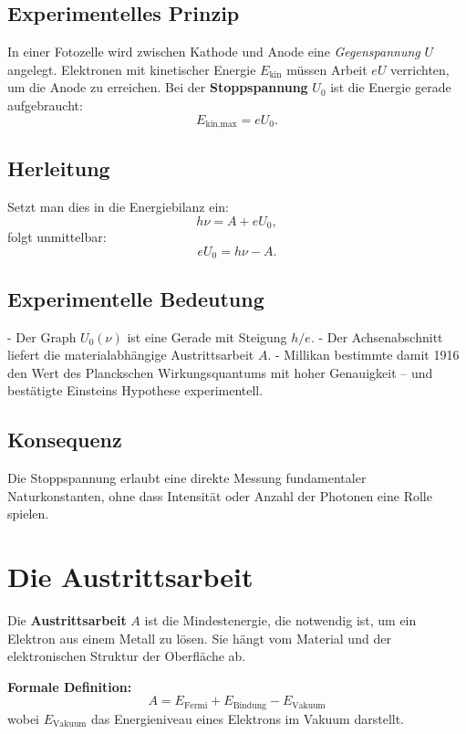 \subsection*{Experimentelles Prinzip}
In einer Fotozelle wird zwischen Kathode und Anode eine \emph{Gegenspannung} \(U\) angelegt.  
Elektronen mit kinetischer Energie \(E_{\text{kin}}\) müssen Arbeit \(eU\) verrichten, um die Anode zu erreichen.  
Bei der \textbf{Stoppspannung} \(U_0\) ist die Energie gerade aufgebraucht:
\[
E_{\text{kin,max}} = eU_0.
\]

\subsection*{Herleitung}
Setzt man dies in die Energiebilanz ein:
\[
h\nu = A + eU_0,
\]
folgt unmittelbar:
\[
eU_0 = h\nu - A.
\]

\subsection*{Experimentelle Bedeutung}
- Der Graph \(U_0(\nu)\) ist eine Gerade mit Steigung \(h/e\).  
- Der Achsenabschnitt liefert die materialabhängige Austrittsarbeit \(A\).  
- Millikan bestimmte damit 1916 den Wert des Planckschen Wirkungsquantums mit hoher Genauigkeit – und bestätigte Einsteins Hypothese experimentell.

\subsection*{Konsequenz}
Die Stoppspannung erlaubt eine direkte Messung fundamentaler Naturkonstanten, ohne dass Intensität oder Anzahl der Photonen eine Rolle spielen.

\section{Die Austrittsarbeit}
\label{anhangA:austrittsarbeit}

Die \textbf{Austrittsarbeit} \( A \) ist die Mindestenergie, die notwendig ist, um ein Elektron aus einem Metall zu lösen. 
Sie hängt vom Material und der elektronischen Struktur der Oberfläche ab. 

\textbf{Formale Definition:}
\[
A = E_{\text{Fermi}} + E_{\text{Bindung}} - E_{\text{Vakuum}}
\]
wobei \( E_{\text{Vakuum}} \) das Energieniveau eines Elektrons im Vakuum darstellt.

